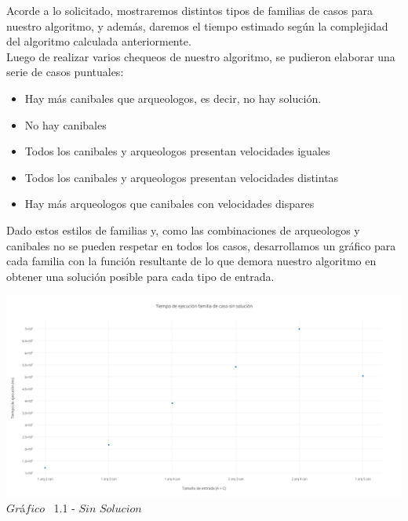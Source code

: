\indent Acorde a lo solicitado, mostraremos distintos tipos de familias de casos para nuestro algoritmo, y adem\'as, daremos el tiempo estimado 
seg\'un la complejidad del algoritmo calculada anteriormente.\\

Luego de realizar varios chequeos de nuestro algoritmo, se pudieron elaborar una serie de casos puntuales:

\begin{itemize}
\item Hay m\'as canibales que arqueologos, es decir, no hay soluci\'on.
\item No hay canibales
\item Todos los canibales y arqueologos presentan velocidades iguales
\item Todos los canibales y arqueologos presentan velocidades distintas
\item Hay m\'as arqueologos que canibales con velocidades dispares
\end{itemize}

Dado estos estilos de familias y, como las combinaciones de arqueologos y canibales no se pueden respetar en todos los casos, desarrollamos un gr\'afico para cada familia con la funci\'on resultante de lo que demora nuestro algoritmo en obtener una soluci\'on posible para cada tipo de entrada.

\vspace*{0.3cm} \vspace*{0.3cm}
  \begin{center}
 \includegraphics[scale=0.45]{./EJ1/sinsolucion.png}
 {$Gr$\'a$fico$ \ 1.1 - $Sin$ $Solucion$}
  \end{center}
  \vspace*{0.3cm}
 
